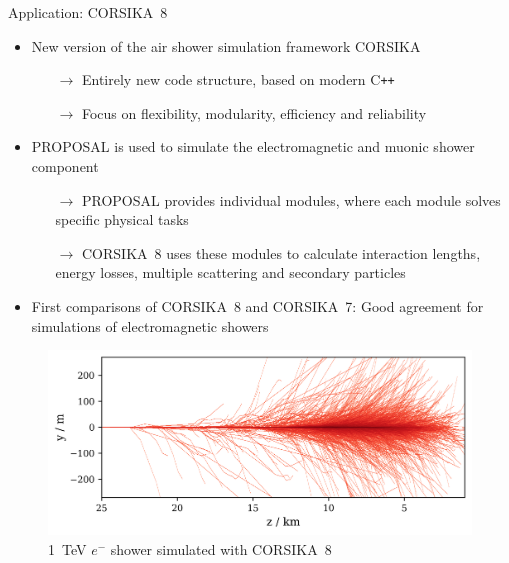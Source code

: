 \documentclass[t]{beamer}
\newlength{\thirdtextwidth}
\newlength{\itemseparation}
\begin{document}
  \begin{columns}[onlytextwidth]%
    \begin{column}{\thirdtextwidth}%
      \begin{block}[equal height group=B]{Application: CORSIKA~8}%
              \begin{itemize}
                \setlength\itemsep{\itemseparation}
                \item New version of the air shower simulation framework CORSIKA
                \begin{itemize}
                  \setlength\itemsep{\itemseparation}
                  \item[$\rightarrow$] Entirely new code structure, based on modern C\texttt{++} 
                  \item[$\rightarrow$] Focus on flexibility, modularity, efficiency and reliability \cite{Engel2018}
                \end{itemize}
                \item PROPOSAL is used to simulate the electromagnetic and muonic shower component
                \begin{itemize}
                  \setlength\itemsep{\itemseparation}
                  \item[$\rightarrow$] PROPOSAL provides individual modules, where each module solves specific physical tasks \cite{Alameddine_2020}
                  \item[$\rightarrow$] CORSIKA~8 uses these modules to calculate interaction lengths, energy losses, multiple scattering and secondary particles 
                \end{itemize}
                \item First comparisons of CORSIKA~8 and CORSIKA~7: Good agreement for simulations of electromagnetic showers \cite{Alameddine:2021iq}
              \end{itemize}

        \vspace{0.5em}

              \begin{figure}
                \centering
                \includegraphics[width=0.8\linewidth, height=.4\textheight, keepaspectratio]{plots/shower_horizonal.png}
                \caption*{\SI{1}{\tera\electronvolt} $e^-$ shower simulated with CORSIKA~8}
              \end{figure}


\end{block}
\end{column}
\end{columns}
\end{document}
